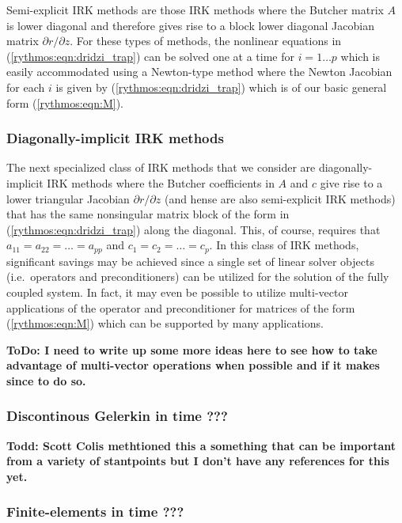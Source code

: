 \documentclass[pdf,ps2pdf,11pt]{SANDreport}
\begin{document}
Semi-explicit IRK methods are those IRK methods where the Butcher matrix $A$
is lower diagonal and therefore gives rise to a block lower diagonal Jacobian
matrix ${}\partial r / {}\partial z$.  For these types of methods, the
nonlinear equations in (\ref{rythmos:eqn:dridzi_trap}) can be solved one at a
time for $i = 1 {}\ldots p$ which is easily accommodated using a Newton-type
method where the Newton Jacobian for each $i$ is given by
(\ref{rythmos:eqn:dridzi_trap}) which is of our basic general form
(\ref{rythmos:eqn:M}).

\subsubsection*{Diagonally-implicit IRK methods}

The next specialized class of IRK methods that we consider are
diagonally-implicit IRK methods where the Butcher coefficients in $A$ and $c$
give rise to a lower triangular Jacobian ${}\partial r / {}\partial z$ (and
hense are also semi-explicit IRK methods) that has the same nonsingular matrix
block of the form in (\ref{rythmos:eqn:dridzi_trap}) along the diagonal.
This, of course, requires that $a_{11} = a_{22} = {}\ldots = a_{pp}$ and
$c_{1} = c_{2} = {}\ldots = c_{p}$.  In this class of IRK methods, significant
savings may be achieved since a single set of linear solver objects (i.e.\
operators and preconditioners) can be utilized for the solution of the fully
coupled system.  In fact, it may even be possible to utilize multi-vector
applications of the operator and preconditioner for matrices of the form
(\ref{rythmos:eqn:M}) which can be supported by many applications.

{}\textbf{ToDo: I need to write up some more ideas here to see how to take
advantage of multi-vector operations when possible and if it makes since to do
so.}

\subsubsection{Discontinous Gelerkin in time ???}

{}\textbf{Todd: Scott Colis methtioned this a something that can be important
from a variety of stantpoints but I don't have any references for this yet.}

\subsubsection{Finite-elements in time ???}
\end{document}
